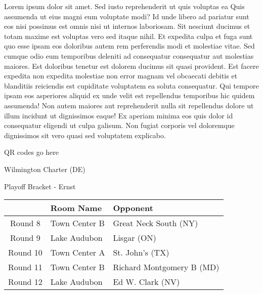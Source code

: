 \documentclass{article}%
\begin{document}
\vspace*{8pt}%
\linebreak%
\newline%
\newline%
Lorem ipsum dolor sit amet. Sed iusto reprehenderit ut quis voluptas ea Quis assumenda ut eius magni eum voluptate modi? Id unde libero ad pariatur sunt eos nisi possimus est omnis nisi ut internos laboriosam. Sit nesciunt ducimus et totam maxime est voluptas vero sed itaque nihil. Et expedita culpa et fuga sunt quo esse ipsam eos doloribus autem rem perferendis modi et molestiae vitae.\newline%
\newline%
Sed cumque odio eum temporibus deleniti ad consequatur consequatur aut molestias maiores. Est doloribus tenetur est dolorem ducimus sit quasi provident. Est facere expedita non expedita molestiae non error magnam vel obcaecati debitis et blanditiis reiciendis est cupiditate voluptatem ea soluta consequatur. Qui tempore ipsam eos asperiores aliquid ex unde velit est repellendus temporibus hic quidem assumenda!\newline%
\newline%
Non autem maiores aut reprehenderit nulla sit repellendus dolore ut illum incidunt ut dignissimos eaque! Ex aperiam minima eos quis dolor id consequatur eligendi ut culpa galisum. Non fugiat corporis vel doloremque dignissimos sit vero quasi sed voluptatem explicabo.\newline%
\newline%
%
\vspace*{30pt}%
\begin{center}%
\begin{Huge}%
QR codes go here%
\end{Huge}%
\end{center}%
\newpage%
\begin{center}%
\begin{Huge}%
Wilmington Charter (DE)%
\end{Huge}%
\vspace*{8pt}%
\linebreak%
\begin{Large}%
Playoff Bracket {-} Ernst%
\end{Large}%
\end{center}%
%
\begin{tabularx}{\textwidth}{|c|Y|Y|}%
\hline%
&Room Name&Opponent\\%
\hline%
Round 8&Town Center B&Great Neck South (NY)\\%
Round 9&Lake Audubon&Lisgar (ON)\\%
Round 10&Town Center A&St. John's (TX)\\%
Round 11&Town Center B&Richard Montgomery B (MD)\\%
Round 12&Lake Audubon&Ed W. Clark (NV)\\%
\hline%
\end{tabularx}%
\end{document}
